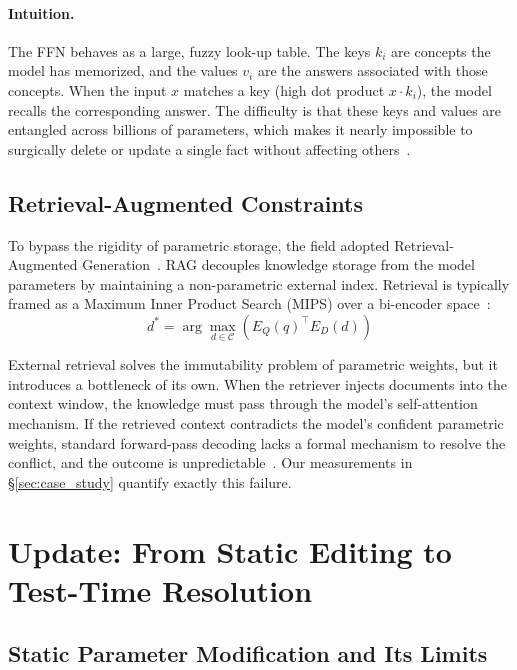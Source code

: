 \documentclass[10pt]{article}
\begin{document}
\paragraph{Intuition.} The FFN behaves as a large, fuzzy look-up table. The keys $k_i$ are concepts the model has memorized, and the values $v_i$ are the answers associated with those concepts. When the input $x$ matches a key (high dot product $x \cdot k_i$), the model recalls the corresponding answer. The difficulty is that these keys and values are entangled across billions of parameters, which makes it nearly impossible to surgically delete or update a single fact without affecting others~\citep{yao2023editingsurvey}.

\subsection{Retrieval-Augmented Constraints}

To bypass the rigidity of parametric storage, the field adopted Retrieval-Augmented Generation~\citep{lewis2020rag}. RAG decouples knowledge storage from the model parameters by maintaining a non-parametric external index. Retrieval is typically framed as a Maximum Inner Product Search (MIPS) over a bi-encoder space~\citep{karpukhin2020dpr}:
\begin{equation}
  d^* = \arg\max_{d \in \mathcal{C}} \left( E_Q(q)^\top E_D(d) \right)
\end{equation}

External retrieval solves the immutability problem of parametric weights, but it introduces a bottleneck of its own. When the retriever injects documents into the context window, the knowledge must pass through the model's self-attention mechanism. If the retrieved context contradicts the model's confident parametric weights, standard forward-pass decoding lacks a formal mechanism to resolve the conflict, and the outcome is unpredictable~\citep{xie2024conflicts, longpre2021entity}. Our measurements in \S\ref{sec:case_study} quantify exactly this failure.

\section{Update: From Static Editing to Test-Time Resolution}
\label{sec:update}

\subsection{Static Parameter Modification and Its Limits}
\end{document}
